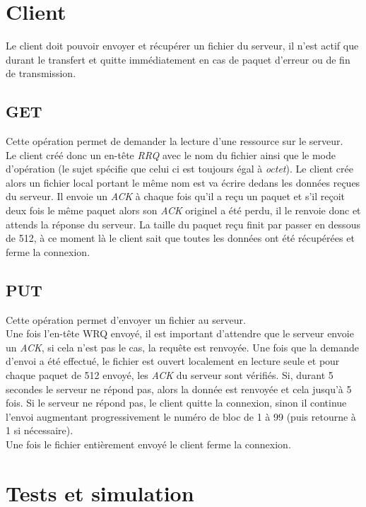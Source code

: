 \documentclass{article}
\begin{document}
\section{Client}
    Le client doit pouvoir envoyer et récupérer un fichier du serveur, il n'est actif que durant le transfert et quitte immédiatement en cas de paquet d'erreur ou de fin de transmission.
    \subsection{GET}
        Cette opération permet de demander la lecture d'une ressource sur le serveur.\\ Le client créé donc un en-tête \emph{RRQ} avec le nom du fichier ainsi que le mode d'opération (le sujet spécifie que celui ci est toujours égal à \emph{octet}). Le client crée alors un fichier local portant le même nom est va écrire dedans les données reçues du serveur. Il envoie un \emph{ACK} à chaque fois qu'il a reçu un paquet et  s'il reçoit deux fois le même paquet alors son \emph{ACK} originel a été perdu, il le renvoie donc et attends la réponse du serveur. La taille du paquet reçu finit par passer en dessous de 512, à ce moment là le client sait que toutes les données ont été récupérées et ferme la connexion.
    
    \subsection{PUT}
        Cette opération permet d'envoyer un fichier au serveur.\\
        Une fois l'en-tête WRQ envoyé, il est important d'attendre que le serveur envoie un \emph{ACK}, si cela n'est pas le cas, la requête est renvoyée. Une fois que la demande d'envoi a été effectué, le fichier est ouvert localement en lecture seule et pour chaque paquet de 512 envoyé, les \emph{ACK} du serveur sont vérifiés. Si, durant 5 secondes le serveur ne répond pas, alors la donnée est renvoyée et cela jusqu'à 5 fois. Si le serveur ne répond pas, le client quitte la connexion, sinon il continue l'envoi augmentant progressivement le numéro de bloc de 1 à 99 (puis retourne à 1 si nécessaire).\\ Une fois le fichier entièrement envoyé le client ferme la connexion.
    
\section{Tests et simulation}
    
\end{document}
